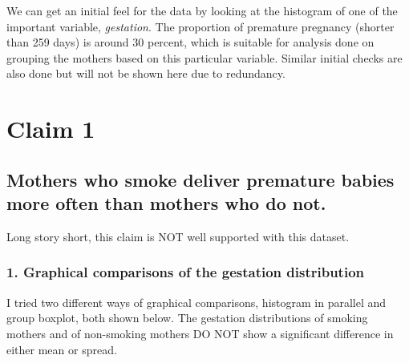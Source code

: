 \documentclass{article}
\begin{document}


We can get an initial feel for the data by looking at the histogram of
one of the important variable, \textit{gestation}. The proportion of
premature pregnancy (shorter than 259 days) is around 30 percent, which is suitable for
analysis done on grouping the mothers based on this particular
variable. Similar initial checks are also done but will not be shown
here due to redundancy.


\newpage
\section*{Claim 1}
\subsection*{Mothers who smoke deliver premature babies more often
  than mothers who do not.}

\hspace{12 pt} Long story short, this claim is NOT well supported with
this dataset.

\subsubsection*{1. Graphical comparisons of the gestation distribution}
\hspace{12 pt} I tried two different ways of graphical comparisons,
histogram in parallel and group boxplot, both shown below. The gestation distributions
of smoking mothers and of non-smoking mothers DO NOT show a
significant difference in either mean or spread. 

\end{document}
